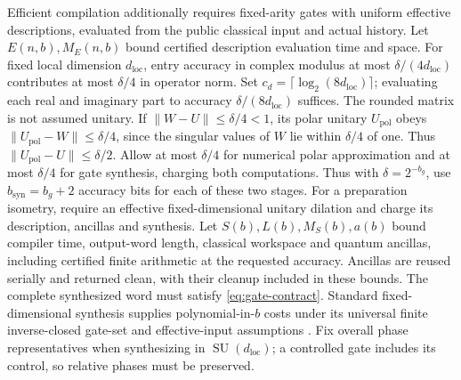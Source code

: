 \documentclass[11pt]{article}
\theoremstyle{remark}
\begin{document}
Efficient compilation additionally requires fixed-arity gates with uniform
effective descriptions, evaluated from the public classical input and actual history.
Let $E(n,b),M_E(n,b)$ bound certified description evaluation time and space.
For fixed local dimension $d_{\mathrm{loc}}$, entry accuracy in complex modulus
at most $\delta/(4d_{\mathrm{loc}})$ contributes at most $\delta/4$ in operator
norm. Set $c_d=\lceil\log_2(8d_{\mathrm{loc}})\rceil$; evaluating each real
and imaginary part to accuracy $\delta/(8d_{\mathrm{loc}})$ suffices.
The rounded matrix is not assumed unitary. If $\|W-U\|\le\delta/4<1$,
its polar unitary $U_{\mathrm{pol}}$ obeys
$\|U_{\mathrm{pol}}-W\|\le\delta/4$, since the singular
values of $W$ lie within $\delta/4$ of one. Thus
$\|U_{\mathrm{pol}}-U\|\le\delta/2$.
Allow at most $\delta/4$ for numerical polar approximation and at most
$\delta/4$ for gate synthesis, charging both computations. Thus with
$\delta=2^{-b_g}$, use $b_{\mathrm{syn}}=b_g+2$ accuracy bits for
each of these two stages. For a preparation
isometry, require an effective fixed-dimensional unitary dilation and
charge its description, ancillas and synthesis. Let
$S(b),L(b),M_S(b),a(b)$ bound compiler time, output-word
length, classical workspace and quantum ancillas, including certified
finite arithmetic at the requested accuracy. Ancillas are reused serially
and returned clean, with their cleanup included in these bounds.
The complete synthesized word must satisfy
\eqref{eq:gate-contract}. Standard fixed-dimensional synthesis supplies
polynomial-in-$b$ costs under its universal finite inverse-closed gate-set
and effective-input assumptions \cite{dn}. Fix overall phase
representatives when synthesizing in $\operatorname{SU}(d_{\mathrm{loc}})$; a controlled
gate includes its control, so relative phases must be preserved.
\end{document}
